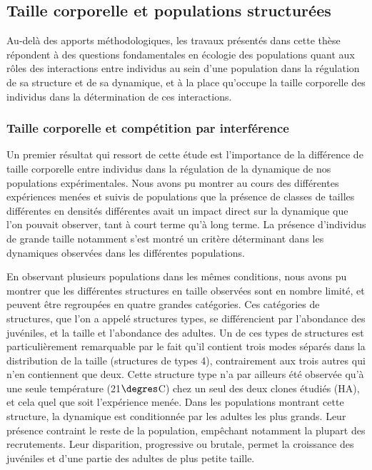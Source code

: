 \subsection{Taille corporelle et populations structurées}

Au-delà des apports méthodologiques, les travaux présentés dans cette thèse
répondent à des questions fondamentales en écologie des populations quant aux
rôles des interactions entre individus au sein d'une population dans la
régulation de sa structure et de sa dynamique, et à la place qu'occupe la taille
corporelle des individus dans la détermination de ces interactions.

\subsubsection{Taille corporelle et compétition par interférence}

Un premier résultat qui ressort de cette étude est l'importance de la différence
de taille corporelle entre individus dans la régulation de la dynamique de nos
populations expérimentales. Nous avons pu montrer au cours des différentes
expériences menées et suivis de populations que la présence de classes de
tailles différentes en densités différentes avait un impact direct sur la
dynamique que l'on pouvait observer, tant à court terme qu'à long terme.
La présence d'individus de grande taille notamment s'est montré un critère
déterminant dans les dynamiques observées dans les différentes populations.

En observant plusieurs populations dans les mêmes conditions, nous avons pu
montrer que les différentes structures en taille observées sont en nombre
limité, et peuvent être regroupées en quatre grandes catégories. Ces catégories
de structures, que l'on a appelé structures types, se différencient par
l'abondance des juvéniles, et la taille et l'abondance des adultes.
Un de ces types de structures est particulièrement remarquable par le fait qu'il
contient trois modes séparés dans la distribution de la taille (structures
de types 4), contrairement aux trois autres qui n'en contiennent que deux. Cette
structure type n'a par ailleurs été observée qu'à une seule température
(21$\degres$C) chez un seul des deux clones étudiés (HA), et cela quel que soit
l'expérience menée. Dans les populations montrant cette structure, la dynamique est conditionnée par les adultes les plus
grands. Leur présence contraint le reste de la population, empêchant notamment
la plupart des recrutements. Leur disparition, progressive ou brutale, permet la
croissance des juvéniles et d'une partie des adultes de plus petite taille.

